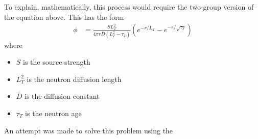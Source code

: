To explain, mathematically, this process would require the two-group version of the equation above. This has the form
\begin{align}
  \phi &= \frac{SL_T^2}{4\pi r \bar{D} (L_T^2 - \tau_T)} \left( e^{-r/L_T} - e^{-r/\sqrt{\tau_T}} \right) 
\end{align}
where 
\begin{itemize} \itemsep1pt \parskip0pt 
  \item $S$ is the source strength
  \item $L_T^2$ is the neutron diffusion length
  \item $\bar{D}$ is the diffusion constant
  \item $\tau_T$ is the neutron age
\end{itemize}
An attempt was made to solve this problem using the 

